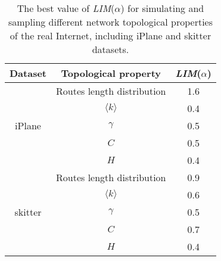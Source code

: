 \documentclass[a4paper]{llncs}
\begin{document}
\begin{table}[!t]
\footnotesize
\caption{The best value of \textit{LIM}($\alpha$) for simulating and sampling different network topological properties of the real Internet, including iPlane and skitter datasets.}
\label{Different alpha for different properties}
\vspace{-1em}
\centering
\setlength{\tabcolsep}{4pt}
\begin{tabular}{c|c||c}
\hline \hline
    Dataset & Topological property & \textit{LIM}($\alpha$) \\
\hline
    & Routes length distribution & 1.6  \\
    \cline{2-3}
           & $\langle k \rangle$ & 0.4  \\
    \cline{2-3}
    iPlane & $\gamma$ & 0.5  \\
    \cline{2-3}
           & $C$ & 0.5  \\
    \cline{2-3}
           & $H$ & 0.4  \\
\hline
    & Routes length distribution & 0.9  \\
    \cline{2-3}
           & $\langle k \rangle$ & 0.6  \\
    \cline{2-3}
    skitter & $\gamma$ & 0.5  \\
    \cline{2-3}
           & $C$ & 0.7  \\
    \cline{2-3}
           & $H$ & 0.4  \\
\hline \hline
\end{tabular}
\end{table}
\end{document}
